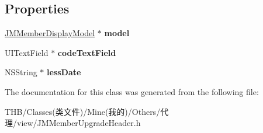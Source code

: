 \subsection*{Properties}
\begin{DoxyCompactItemize}
\item 
\mbox{\label{interface_j_m_member_upgrade_header_a5afeebe4b1916678b222b1492746f68c}} 
\mbox{\hyperlink{interface_j_m_member_display_model}{J\+M\+Member\+Display\+Model}} $\ast$ {\bfseries model}
\item 
\mbox{\label{interface_j_m_member_upgrade_header_a83faa98555f8be836332ac42dee1148b}} 
U\+I\+Text\+Field $\ast$ {\bfseries code\+Text\+Field}
\item 
\mbox{\label{interface_j_m_member_upgrade_header_a25fb8bf7956ec231baf7ee5ad99fb3f7}} 
N\+S\+String $\ast$ {\bfseries less\+Date}
\end{DoxyCompactItemize}


The documentation for this class was generated from the following file\+:\begin{DoxyCompactItemize}
\item 
T\+H\+B/\+Classes(类文件)/\+Mine(我的)/\+Others/代理/view/J\+M\+Member\+Upgrade\+Header.\+h\end{DoxyCompactItemize}
